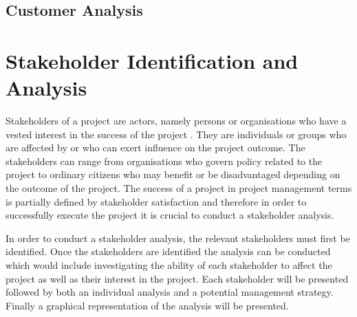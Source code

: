 \addtocounter{footnote}{-9}

\subsection{Customer Analysis}


\section{Stakeholder Identification and Analysis}
\label{sec:stak_anal}


Stakeholders of a project are actors, namely persons or organisations who have a vested interest in the success of the project \cite{gotstake}. They are individuals or groups who are affected by or who can exert influence on the project outcome. The stakeholders can range from organisations who govern policy related to the project to ordinary citizens who may benefit or be disadvantaged depending on the outcome of the project. The success of a project in project management terms is partially defined by stakeholder satisfaction and therefore in order to successfully execute the project it is crucial to conduct a stakeholder analysis.

In order to conduct a stakeholder analysis, the relevant stakeholders must first be identified. Once the stakeholders are identified the analysis can be conducted which would include investigating the ability of each stakeholder to affect the project as well as their interest in the project. Each stakeholder will be presented followed by both an individual analysis and a potential management strategy. Finally a graphical representation of the analysis will be presented.


